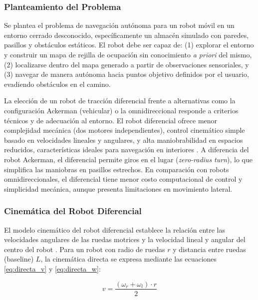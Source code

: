 \documentclass[12pt,letterpaper]{article}
\begin{document}
\subsubsection{Planteamiento del Problema}
\label{sec:problema}

Se plantea el problema de navegación autónoma para un robot móvil en un entorno cerrado desconocido, específicamente un almacén simulado con paredes, pasillos y obstáculos estáticos. El robot debe ser capaz de: (1) explorar el entorno y construir un mapa de rejilla de ocupación sin conocimiento \textit{a priori} del mismo, (2) localizarse dentro del mapa generado a partir de observaciones sensoriales, y (3) navegar de manera autónoma hacia puntos objetivo definidos por el usuario, evadiendo obstáculos en el camino.

La elección de un robot de tracción diferencial frente a alternativas como la configuración Ackerman (vehicular) o la omnidireccional responde a criterios técnicos y de adecuación al entorno. El robot diferencial ofrece menor complejidad mecánica (dos motores independientes), control cinemático simple basado en velocidades lineales y angulares, y alta maniobrabilidad en espacios reducidos, características ideales para navegación en interiores \citep{siegwart2011introduction}. A diferencia del robot Ackerman, el diferencial permite giros en el lugar (\textit{zero-radius turn}), lo que simplifica las maniobras en pasillos estrechos. En comparación con robots omnidireccionales, el diferencial tiene menor costo computacional de control y simplicidad mecánica, aunque presenta limitaciones en movimiento lateral.

\subsubsection{Cinemática del Robot Diferencial}
\label{sec:cinematica}

El modelo cinemático del robot diferencial establece la relación entre las velocidades angulares de las ruedas motrices y la velocidad lineal y angular del centro del robot \citep{siegwart2011introduction}. Para un robot con radio de ruedas $r$ y distancia entre ruedas (baseline) $L$, la cinemática directa se expresa mediante las ecuaciones \eqref{eq:directa_v} y \eqref{eq:directa_w}:

\begin{equation}
    v = \frac{(\omega_r + \omega_l) \cdot r}{2}
    \label{eq:directa_v}
\end{equation}
\end{document}

